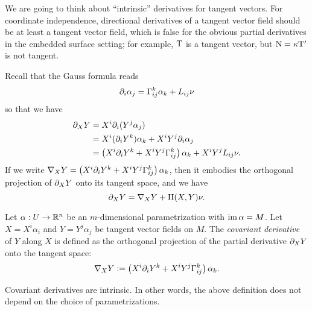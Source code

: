 \documentclass{../../large}
\renewcommand{\a}{\alpha}
\newcommand{\II}{\mathrm{II}}
\begin{document}
\begin{prb}

\end{prb}





\begin{prb}
We are going to think about ``intrinsic'' derivatives for tangent vectors.
For coordinate independence, directional derivatives of a tangent vector field should be at least a tangent vector field, which is false for the obvious partial derivatives in the embedded surface setting; for example, $\mathrm{T}$ is a tangent vector, but $\mathrm{N}=\kappa\mathrm{T}'$ is not tangent.

Recall that the Gauss formula reads
\[\pd_i\a_j=\Gamma_{ij}^k\a_k+L_{ij}\nu\]
so that we have
\begin{align*}
\pd_XY
&=X^i\pd_i(Y^j\a_j)\\
&=X^i(\pd_iY^k)\a_k+X^iY^j\pd_i\a_j\\
&=\left(X^i\pd_iY^k+X^iY^j\Gamma_{ij}^k\right)\a_k+X^iY^jL_{ij}\nu.
\end{align*}
If we write $\nabla_XY=\left(X^i\pd_iY^k+X^iY^j\Gamma_{ij}^k\right)\a_k$, then it embodies the orthogonal projection of $\pd_XY$ onto its tangent space, and we have
\[\pd_XY=\nabla_XY+\II(X,Y)\nu.\]

Let $\a:U\to\R^n$ be an $m$-dimensional parametrization with $\im\a=M$.
Let $X=X^i\a_i$ and $Y=Y^j\a_j$ be tangent vector fields on $M$.
The \emph{covariant derivative} of $Y$ along $X$ is defined as the orthogonal projection of the partial derivative $\pd_XY$ onto the tangent space:
\[\nabla_XY:=\left(X^i\pd_iY^k+X^iY^j\Gamma_{ij}^k\right)\a_k.\]
\begin{parts}
\item
Covariant derivatives are intrinsic.
In other words, the above definition does not depend on the choice of parametrizations.
\end{parts}
\end{prb}
\end{document}
